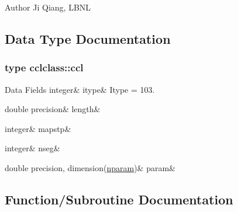 \begin{DoxyAuthor}{Author}
Ji Qiang, L\+B\+NL 
\end{DoxyAuthor}


\subsection{Data Type Documentation}
\label{structcclclass_1_1ccl}
\subsubsection{type cclclass\+::ccl}
\begin{DoxyFields}{Data Fields}
\mbox{\label{namespacecclclass_ac0907eebcd93b9aa41c33858f394496d}} 
integer&
itype&
Itype = 103. \\
\hline

\mbox{\label{namespacecclclass_a128d51138685ec33b8c0c7f6bd89dc81}} 
double precision&
length&
\\
\hline

\mbox{\label{namespacecclclass_a5d663b5eeafc5a924cfe6383143f9b0a}} 
integer&
mapstp&
\\
\hline

\mbox{\label{namespacecclclass_a37e0a279ff69258948ddecf0a4c78045}} 
integer&
nseg&
\\
\hline

\mbox{\label{namespacecclclass_a4b800d069f005c436b2295924f8f7bb9}} 
double precision, dimension(\mbox{\hyperlink{namespacecclclass_adeb399ff41e54cda7bdefa51063c0de6}{nparam}})&
param&
\\
\hline

\end{DoxyFields}


\subsection{Function/\+Subroutine Documentation}
\mbox{\label{namespacecclclass_af38d062f04c18827d1d2a76c17039c58}} 
